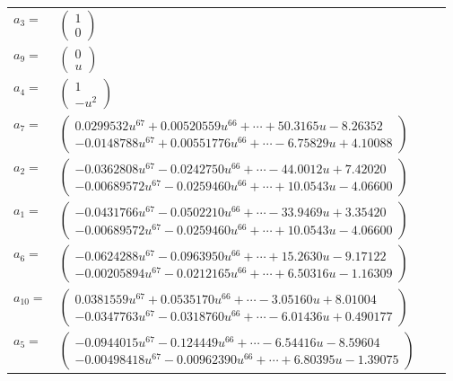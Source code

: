 \documentclass[1p]{elsarticle_modified}
\theoremstyle{definition}
\begin{document}
\begin{tabular}{m{7pt} m{180pt} m{7pt} m{180pt} }
\flushright $a_{3}=$&$\begin{pmatrix}1\\0\end{pmatrix}$ \\
\flushright $a_{9}=$&$\begin{pmatrix}0\\u\end{pmatrix}$ \\
\flushright $a_{4}=$&$\begin{pmatrix}1\\- u^2\end{pmatrix}$ \\
\flushright $a_{7}=$&$\begin{pmatrix}0.0299532 u^{67}+0.00520559 u^{66}+\cdots+50.3165 u-8.26352\\-0.0148788 u^{67}+0.00551776 u^{66}+\cdots-6.75829 u+4.10088\end{pmatrix}$ \\
\flushright $a_{2}=$&$\begin{pmatrix}-0.0362808 u^{67}-0.0242750 u^{66}+\cdots-44.0012 u+7.42020\\-0.00689572 u^{67}-0.0259460 u^{66}+\cdots+10.0543 u-4.06600\end{pmatrix}$ \\
\flushright $a_{1}=$&$\begin{pmatrix}-0.0431766 u^{67}-0.0502210 u^{66}+\cdots-33.9469 u+3.35420\\-0.00689572 u^{67}-0.0259460 u^{66}+\cdots+10.0543 u-4.06600\end{pmatrix}$ \\
\flushright $a_{6}=$&$\begin{pmatrix}-0.0624288 u^{67}-0.0963950 u^{66}+\cdots+15.2630 u-9.17122\\-0.00205894 u^{67}-0.0212165 u^{66}+\cdots+6.50316 u-1.16309\end{pmatrix}$ \\
\flushright $a_{10}=$&$\begin{pmatrix}0.0381559 u^{67}+0.0535170 u^{66}+\cdots-3.05160 u+8.01004\\-0.0347763 u^{67}-0.0318760 u^{66}+\cdots-6.01436 u+0.490177\end{pmatrix}$ \\
\flushright $a_{5}=$&$\begin{pmatrix}-0.0944015 u^{67}-0.124449 u^{66}+\cdots-6.54416 u-8.59604\\-0.00498418 u^{67}-0.00962390 u^{66}+\cdots+6.80395 u-1.39075\end{pmatrix}$ \\

\end{tabular}
\end{document}
